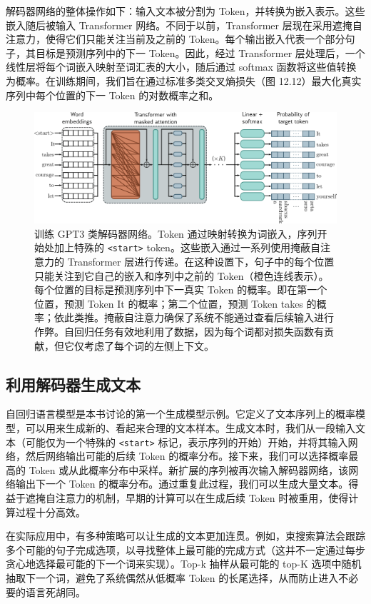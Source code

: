 解码器网络的整体操作如下：输入文本被分割为 Token，并转换为嵌入表示。这些嵌入随后被输入 Transformer 网络。不同于以前，Transformer 层现在采用遮掩自注意力，使得它们只能关注当前及之前的 Token。每个输出嵌入代表一个部分句子，其目标是预测序列中的下一 Token。因此，经过 Transformer 层处理后，一个线性层将每个词嵌入映射至词汇表的大小，随后通过 softmax 函数将这些值转换为概率。在训练期间，我们旨在通过标准多类交叉熵损失（图 12.12）最大化真实序列中每个位置的下一 Token 的对数概率之和。

\begin{figure}[ht!]
\centering
\includegraphics[width=0.7\linewidth]{png/chapter12/TransformerDecoder.png}
\caption{训练 GPT3 类解码器网络。Token 通过映射转换为词嵌入，序列开始处加上特殊的 \texttt{\textless start\textgreater} token。这些嵌入通过一系列使用掩蔽自注意力的 Transformer 层进行传递。在这种设置下，句子中的每个位置只能关注到它自己的嵌入和序列中之前的 Token（橙色连线表示）。每个位置的目标是预测序列中下一真实 Token 的概率。即在第一个位置，预测 Token It 的概率；第二个位置，预测 Token takes 的概率；依此类推。掩蔽自注意力确保了系统不能通过查看后续输入进行作弊。自回归任务有效地利用了数据，因为每个词都对损失函数有贡献，但它仅考虑了每个词的左侧上下文。}
\end{figure}

\subsection{利用解码器生成文本}
自回归语言模型是本书讨论的第一个生成模型示例。它定义了文本序列上的概率模型，可以用来生成新的、看起来合理的文本样本。生成文本时，我们从一段输入文本（可能仅为一个特殊的 \texttt{\textless start\textgreater} 标记，表示序列的开始）开始，并将其输入网络，然后网络输出可能的后续 Token 的概率分布。接下来，我们可以选择概率最高的 Token 或从此概率分布中采样。新扩展的序列被再次输入解码器网络，该网络输出下一个 Token 的概率分布。通过重复此过程，我们可以生成大量文本。得益于遮掩自注意力的机制，早期的计算可以在生成后续 Token 时被重用，使得计算过程十分高效。

在实际应用中，有多种策略可以让生成的文本更加连贯。例如，束搜索算法会跟踪多个可能的句子完成选项，以寻找整体上最可能的完成方式（这并不一定通过每步贪心地选择最可能的下一个词来实现）。Top-k 抽样从最可能的 top-K 选项中随机抽取下一个词，避免了系统偶然从低概率 Token 的长尾选择，从而防止进入不必要的语言死胡同。

